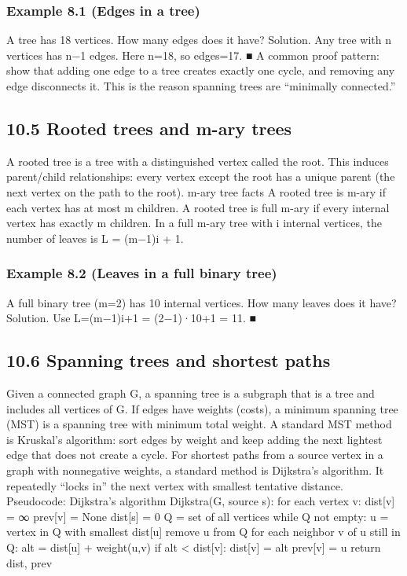 \documentclass[11pt]{article}
\begin{document}
\subsubsection*{Example 8.1 (Edges in a tree)}
A tree has 18 vertices. How many edges does it have?
Solution. Any tree with n vertices has n−1 edges. Here n=18, so edges=17. ■
A common proof pattern: show that adding one edge to a tree creates exactly one cycle,
and removing any edge disconnects it. This is the reason spanning trees are “minimally
connected.”

\subsection{10.5 Rooted trees and m-ary trees}
A rooted tree is a tree with a distinguished vertex called the root. This induces parent/child
relationships: every vertex except the root has a unique parent (the next vertex on the
path to the root).
m-ary tree facts
A rooted tree is m-ary if each vertex has at most m children.
A rooted tree is full m-ary if every internal vertex has exactly m children.
In a full m-ary tree with i internal vertices, the number of leaves is L = (m−1)i + 1.
\subsubsection*{Example 8.2 (Leaves in a full binary tree)}
A full binary tree (m=2) has 10 internal vertices. How many leaves does it have?
Solution. Use L=(m−1)i+1 = (2−1)·10+1 = 11. ■
\subsection{10.6 Spanning trees and shortest paths}
Given a connected graph G, a spanning tree is a subgraph that is a tree and includes all
vertices of G. If edges have weights (costs), a minimum spanning tree (MST) is a spanning
tree with minimum total weight.
A standard MST method is Kruskal’s algorithm: sort edges by weight and keep adding the
next lightest edge that does not create a cycle.
For shortest paths from a source vertex in a graph with nonnegative weights, a standard
method is Dijkstra’s algorithm. It repeatedly “locks in” the next vertex with smallest
tentative distance.
Pseudocode: Dijkstra’s algorithm
Dijkstra(G, source s):
    for each vertex v:
        dist[v] = ∞
        prev[v] = None
    dist[s] = 0
    Q = set of all vertices
    while Q not empty:
        u = vertex in Q with smallest dist[u]
        remove u from Q
        for each neighbor v of u still in Q:
            alt = dist[u] + weight(u,v)
            if alt < dist[v]:
                dist[v] = alt
                prev[v] = u
    return dist, prev
\end{document}
